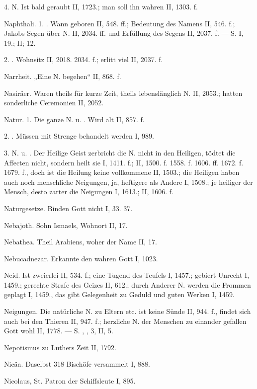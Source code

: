 4.  N. Ist bald geraubt II, 1723.; man soll ihn wahren II, 1303. f.

Naphthali. 1. . Wann geboren II, 548. ff.; Bedeutung des Namens II, 546. f.; Jakobs Segen über N. II, 2034. ff. und Erfüllung des Segens II, 2037. f. — S.  I, 19.; II;  12.

2. . Wohnsitz II, 2018. 2034. f.; erlitt viel II, 2037. f.

Narrheit. „Eine N. begehen“ II, 868. f.

Nasiräer. Waren theils für kurze Zeit, theils lebenslänglich N. II, 2053.; hatten sonderliche Ceremonien II, 2052.

Natur. 1. Die ganze N. u. . Wird alt II, 857. f.

2. . Müssen mit Strenge behandelt werden I, 989.

3. N. u. . Der Heilige Geist zerbricht die N. nicht in den Heiligen, tödtet die Affecten nicht, sondern heilt sie I, 1411. f.; II, 1500. f. 1558. f. 1606. ff. 1672. f. 1679. f., doch ist die Heilung keine vollkommene II, 1503.; die Heiligen haben auch noch menschliche Neigungen, ja, heftigere als Andere I, 1508.; je heiliger der Mensch, desto zarter die Neigungen I, 1613.; II, 1606. f.

Naturgesetze. Binden Gott nicht I, 33. 37.

Nebajoth. Sohn Ismaels, Wohnort II, 17.

Nebathea. Theil Arabiens, woher der Name II, 17.

Nebucadnezar. Erkannte den wahren Gott I, 1023.

Neid. Ist zweierlei II, 534. f.; eine Tugend des Teufels I, 1457.; gebiert Unrecht I, 1459.; gerechte Strafe des Geizes II, 612.; durch Anderer N. werden die Frommen geplagt I, 1459., das gibt Gelegenheit zu Geduld und guten Werken I, 1459.

Neigungen. Die natürliche N. zu Eltern etc. ist keine Sünde II, 944. f., findet sich auch bei den Thieren II, 947. f.; herzliche N. der Menschen zu einander gefallen Gott wohl II, 1778. — S. , ,  3,  II, 5.

Nepotismus zu Luthers Zeit II, 1792.

Nicäa. Daselbst 318 Bischöfe versammelt I, 888.

Nicolaus, St. Patron der Schiffsleute I, 895.

